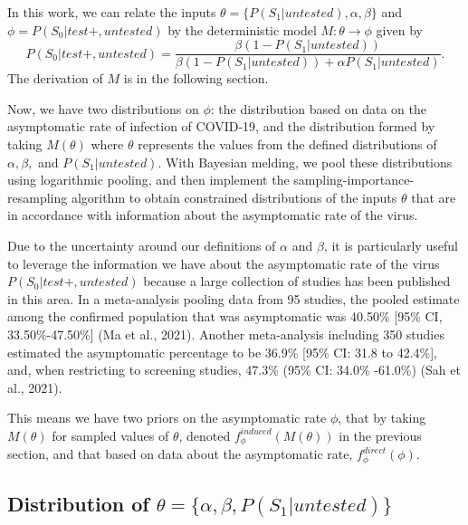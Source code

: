 \documentclass[12pt,twoside]{smiththesis}
\begin{document}
In this work, we can relate the inputs \(\theta = \{P(S_1|untested), \alpha, \beta \}\) and \(\phi = P(S_0|test +,untested)\) by the deterministic model \(M: \theta \to \phi\) given by \[P(S_0|test+, untested) = \frac{\beta(1 - P(S_1|untested))}{\beta(1-P(S_1|untested)) + \alpha P(S_1|untested)}.\] The derivation of \(M\) is in the following section.

Now, we have two distributions on \(\phi\): the distribution based on data on the asymptomatic rate of infection of COVID-19, and the distribution formed by taking \(M(\theta)\) where \(\theta\) represents the values from the defined distributions of \(\alpha,\beta,\) and \(P(S_1|untested)\). With Bayesian melding, we pool these distributions using logarithmic pooling, and then implement the sampling-importance-resampling algorithm to obtain constrained distributions of the inputs \(\theta\) that are in accordance with information about the asymptomatic rate of the virus.

Due to the uncertainty around our definitions of \(\alpha\) and \(\beta\), it is particularly useful to leverage the information we have about the asymptomatic rate of the virus \(P(S_0|test +,untested)\) because a large collection of studies has been published in this area. In a meta-analysis pooling data from 95 studies, the pooled estimate among the confirmed population that was asymptomatic was 40.50\% {[}95\% CI, 33.50\%-47.50\%{]} (Ma et al., 2021). Another meta-analysis including 350 studies estimated the asymptomatic percentage to be 36.9\% {[}95\% CI: 31.8 to 42.4\%{]}, and, when restricting to screening studies, 47.3\% (95\% CI: 34.0\% -61.0\%) (Sah et al., 2021).

This means we have two priors on the asymptomatic rate \(\phi\), that by taking \(M(\theta)\) for sampled values of \(\theta\), denoted \(f_\phi^{induced}(M(\theta))\) in the previous section, and that based on data about the asymptomatic rate, \(f_\phi^{direct}(\phi)\).

\hypertarget{distribution-of-theta-alpha-beta-ps_1untested}{%
\subsection{\texorpdfstring{Distribution of \(\theta = \{\alpha, \beta, P(S_1|untested) \}\)}{Distribution of \textbackslash theta = \textbackslash\{\textbackslash alpha, \textbackslash beta, P(S\_1\textbar untested) \textbackslash\}}}\label{distribution-of-theta-alpha-beta-ps_1untested}}
\end{document}
